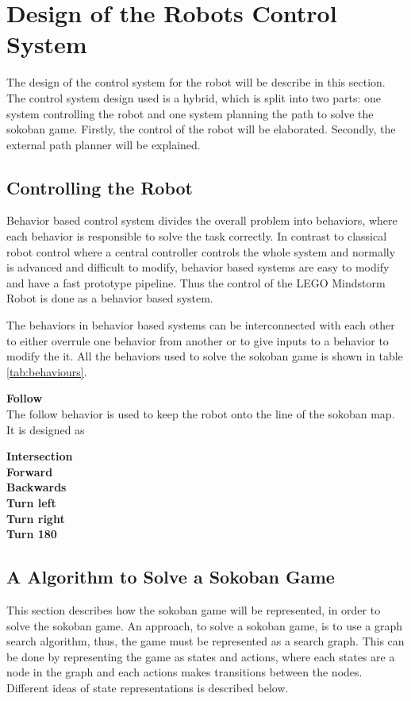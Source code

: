 \documentclass[../report.tex]{subfiles}
\begin{document}
\section{Design of the Robots Control System} \label{sec:control_system}

The design of the control system for the robot will be describe in this section. The control system design used is a hybrid, which is split into two parts: one system controlling the robot and one system planning the path to solve the sokoban game. Firstly, the control of the robot will be elaborated. Secondly, the external path planner will be explained.


\subsection{Controlling the Robot} \label{subsec:controlling}
Behavior based control system divides the overall problem into behaviors, where each behavior is responsible to solve the task correctly. In contrast to classical robot control where a central controller controls the whole system and normally is advanced and difficult to modify, behavior based systems are easy to modify and have a fast prototype pipeline. Thus the control of the LEGO Mindstorm Robot is done as a behavior based system.  

The behaviors in behavior based systems can be interconnected with each other to either overrule one behavior from another or to give inputs to a behavior to modify the it. All the behaviors used to solve the sokoban game is shown in table \ref{tab:behaviours}. 

\textbf{Follow}\\
The follow behavior is used to keep the robot onto the line of the sokoban map. It is designed as 

\textbf{Intersection}\\


\textbf{Forward}\\


\textbf{Backwards}\\


\textbf{Turn left}\\


\textbf{Turn right}\\


\textbf{Turn 180}\\




\subsection{A Algorithm to Solve a Sokoban Game} \label{subsec:sokoban_solver}
This section describes how the sokoban game will be represented, in order to solve the sokoban game. An approach, to solve a sokoban game, is to use a graph search algorithm, thus, the game must be represented as a search graph. This can be done by representing the game as states and actions, where each states are a node in the graph and each actions makes transitions between the nodes. Different ideas of state representations is described below.
\end{document}
